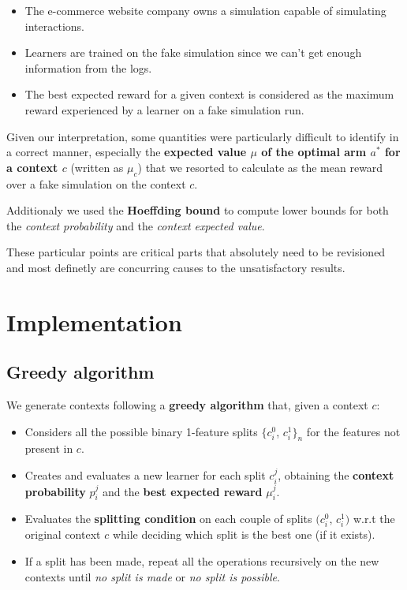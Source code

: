 \begin{itemize}
    \item The e-commerce website company owns a simulation capable of simulating interactions.
    \item Learners are trained on the fake simulation since we can't get enough information from the logs.
    \item The best expected reward for a given context is considered as the maximum reward experienced by a learner on a fake simulation run.
\end{itemize}

Given our interpretation, some quantities were particularly difficult to identify in a correct manner, especially the \textbf{expected value $\mu$ of the optimal arm $a^*$ for a context $c$} (written as $\mu_c$) that we resorted to calculate as the mean reward over a fake simulation on the context $c$.

Additionaly we used the \textbf{Hoeffding bound} to compute lower bounds for both the \textit{context probability} and the \textit{context expected value}.

These particular points are critical parts that absolutely need to be revisioned and most definetly are concurring causes to the unsatisfactory results.

\section{Implementation}

\subsection{Greedy algorithm}

We generate contexts following a \textbf{greedy algorithm} that, given a context $c$:

\begin{itemize}
    \item Considers all the possible binary 1-feature splits $\{c_i^0$, $c_i^1\}_n$ for the features not present in $c$.
    \item Creates and evaluates a new learner for each split $c_i^j$, obtaining the \textbf{context probability} $p_i^j$ and the \textbf{best expected reward} $\mu_i^j$.
    \item Evaluates the \textbf{splitting condition} on each couple of splits $(c_i^0$, $c_i^1)$ w.r.t the original context $c$ while deciding which split is the best one (if it exists).
    \item If a split has been made, repeat all the operations recursively on the new contexts until \textit{no split is made} or \textit{no split is possible}.
\end{itemize}

